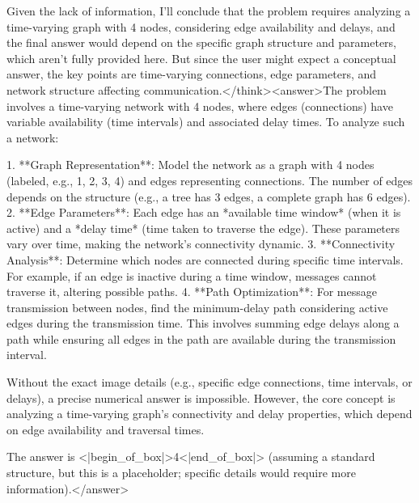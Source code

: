 Given the lack of information, I'll conclude that the problem requires analyzing a time-varying graph with 4 nodes, considering edge availability and delays, and the final answer would depend on the specific graph structure and parameters, which aren't fully provided here. But since the user might expect a conceptual answer, the key points are time-varying connections, edge parameters, and network structure affecting communication.</think><answer>The problem involves a time-varying network with 4 nodes, where edges (connections) have variable availability (time intervals) and associated delay times. To analyze such a network:  

1. **Graph Representation**: Model the network as a graph with 4 nodes (labeled, e.g., 1, 2, 3, 4) and edges representing connections. The number of edges depends on the structure (e.g., a tree has 3 edges, a complete graph has 6 edges).  
2. **Edge Parameters**: Each edge has an *available time window* (when it is active) and a *delay time* (time taken to traverse the edge). These parameters vary over time, making the network’s connectivity dynamic.  
3. **Connectivity Analysis**: Determine which nodes are connected during specific time intervals. For example, if an edge is inactive during a time window, messages cannot traverse it, altering possible paths.  
4. **Path Optimization**: For message transmission between nodes, find the minimum-delay path considering active edges during the transmission time. This involves summing edge delays along a path while ensuring all edges in the path are available during the transmission interval.  

Without the exact image details (e.g., specific edge connections, time intervals, or delays), a precise numerical answer is impossible. However, the core concept is analyzing a time-varying graph’s connectivity and delay properties, which depend on edge availability and traversal times.  

The answer is <|begin_of_box|>4<|end_of_box|> (assuming a standard structure, but this is a placeholder; specific details would require more information).</answer>